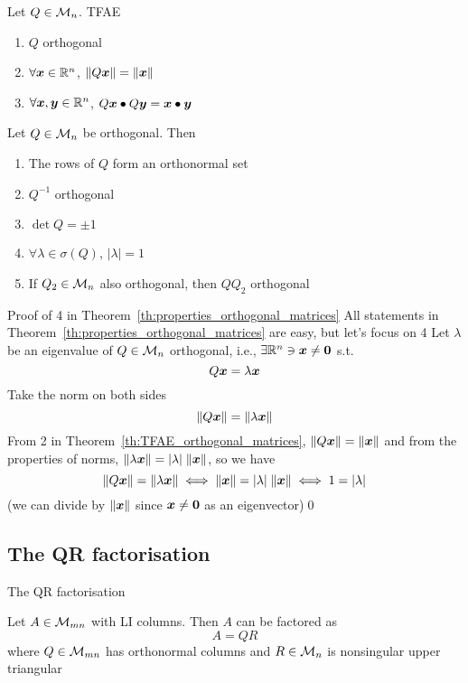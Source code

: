 \documentclass[aspectratio=169]{beamer}\usepackage[]{graphicx}\usepackage[]{xcolor}
\begin{document}
\begin{frame}
\begin{theorem}
\label{th:TFAE_orthogonal_matrices}
Let $Q\in\mathcal{M}_n$. TFAE
\begin{enumerate}
\item $Q$ orthogonal
\item $\forall\bm{x}\in\mathbb{R}^n$, $\|Q\bm{x}\|=\|\bm{x}\|$
\item $\forall\bm{x},\bm{y}\in\mathbb{R}^n$, $Q\bm{x}\bullet Q\bm{y}=\bm{x}\bullet\bm{y}$
\end{enumerate}
\end{theorem}
\vfill
\begin{theorem}\label{th:properties_orthogonal_matrices}
Let $Q\in\mathcal{M}_n$ be orthogonal. Then
\begin{enumerate}
\item The rows of $Q$ form an orthonormal set
\item $Q^{-1}$ orthogonal
\item $\det Q=\pm 1$
\item $\forall\lambda\in\sigma(Q)$, $|\lambda|=1$
\item If $Q_2\in\mathcal{M}_n$ also orthogonal, then $QQ_2$ orthogonal
\end{enumerate}
\end{theorem}
\end{frame}



\begin{frame}{Proof of 4 in Theorem~\ref{th:properties_orthogonal_matrices}}
All statements in Theorem~\ref{th:properties_orthogonal_matrices} are easy, but let's focus on 4 
\vfill
Let $\lambda$ be an eigenvalue of $Q\in\mathcal{M}_n$ orthogonal, i.e., $\exists\IR^n\ni\bx\neq\b0$ s.t.
\[
Q\bm{x} = \lambda\bm{x}
\]
Take the norm on both sides
\[
\|Q\bm{x}\| = \|\lambda\bm{x}\|
\]
From 2 in Theorem~\ref{th:TFAE_orthogonal_matrices}, $\|Q\bm{x}\|=\|\bm{x}\|$ and from the properties of norms, $\|\lambda\bm{x}\|=|\lambda|\;\|\bm{x}\|$, so we have
\[
\|Q\bm{x}\| = \|\lambda\bm{x}\| \iff \|\bm{x}\| = |\lambda|\;\|\bm{x}\| \iff 1=|\lambda|
\]
(we can divide by $\|\bm{x}\|$ since $\bx\neq \b0$ as an eigenvector)\hfill\qed
\end{frame}



\subsection{The QR factorisation}
\begin{frame}{The QR factorisation}
\begin{theorem}\label{th:QR_factorisation}
Let $A\in\mathcal{M}_{mn}$ with LI columns. Then $A$ can be factored as
\[
A=QR
\]
where $Q\in\mathcal{M}_{mn}$ has orthonormal columns and $R\in\mathcal{M}_n$ is nonsingular upper triangular
\end{theorem}
\end{frame}
\end{document}
